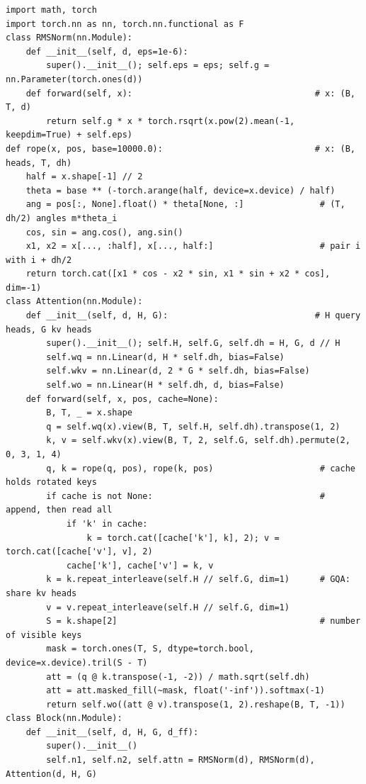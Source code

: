 \begin{lstlisting}[caption={Reference implementation (ours): a minimal decoder-only Transformer with RoPE, GQA, SwiGLU and a KV cache.},label={lst:c01-tinylm}]
import math, torch
import torch.nn as nn, torch.nn.functional as F
class RMSNorm(nn.Module):
    def __init__(self, d, eps=1e-6):
        super().__init__(); self.eps = eps; self.g = nn.Parameter(torch.ones(d))
    def forward(self, x):                                    # x: (B, T, d)
        return self.g * x * torch.rsqrt(x.pow(2).mean(-1, keepdim=True) + self.eps)
def rope(x, pos, base=10000.0):                              # x: (B, heads, T, dh)
    half = x.shape[-1] // 2
    theta = base ** (-torch.arange(half, device=x.device) / half)
    ang = pos[:, None].float() * theta[None, :]               # (T, dh/2) angles m*theta_i
    cos, sin = ang.cos(), ang.sin()
    x1, x2 = x[..., :half], x[..., half:]                     # pair i with i + dh/2
    return torch.cat([x1 * cos - x2 * sin, x1 * sin + x2 * cos], dim=-1)
class Attention(nn.Module):
    def __init__(self, d, H, G):                             # H query heads, G kv heads
        super().__init__(); self.H, self.G, self.dh = H, G, d // H
        self.wq = nn.Linear(d, H * self.dh, bias=False)
        self.wkv = nn.Linear(d, 2 * G * self.dh, bias=False)
        self.wo = nn.Linear(H * self.dh, d, bias=False)
    def forward(self, x, pos, cache=None):
        B, T, _ = x.shape
        q = self.wq(x).view(B, T, self.H, self.dh).transpose(1, 2)
        k, v = self.wkv(x).view(B, T, 2, self.G, self.dh).permute(2, 0, 3, 1, 4)
        q, k = rope(q, pos), rope(k, pos)                     # cache holds rotated keys
        if cache is not None:                                 # append, then read all
            if 'k' in cache:
                k = torch.cat([cache['k'], k], 2); v = torch.cat([cache['v'], v], 2)
            cache['k'], cache['v'] = k, v
        k = k.repeat_interleave(self.H // self.G, dim=1)      # GQA: share kv heads
        v = v.repeat_interleave(self.H // self.G, dim=1)
        S = k.shape[2]                                        # number of visible keys
        mask = torch.ones(T, S, dtype=torch.bool, device=x.device).tril(S - T)
        att = (q @ k.transpose(-1, -2)) / math.sqrt(self.dh)
        att = att.masked_fill(~mask, float('-inf')).softmax(-1)
        return self.wo((att @ v).transpose(1, 2).reshape(B, T, -1))
class Block(nn.Module):
    def __init__(self, d, H, G, d_ff):
        super().__init__()
        self.n1, self.n2, self.attn = RMSNorm(d), RMSNorm(d), Attention(d, H, G)

\end{lstlisting}
